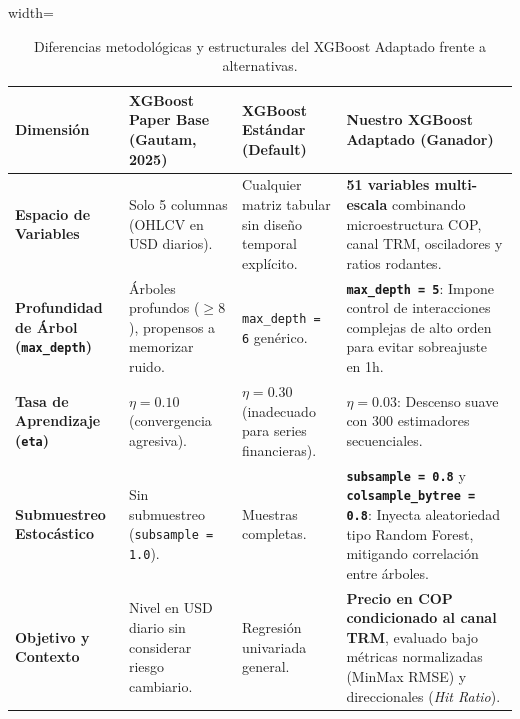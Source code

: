 \documentclass[12pt,letterpaper]{article}
\begin{document}
\begin{table}[H]
\centering
\caption{Diferencias metodológicas y estructurales del XGBoost Adaptado frente a alternativas.}
\label{tab:xgboost_differences}
\begin{adjustbox}{width=\textwidth}
\begin{tabular}{lp{4.5cm}p{4.5cm}p{4.5cm}}
\toprule
\textbf{Dimensión} & \textbf{XGBoost Paper Base (Gautam, 2025)} & \textbf{XGBoost Estándar (Default)} & \textbf{Nuestro XGBoost Adaptado (Ganador)} \\
\midrule
\textbf{Espacio de Variables} & Solo 5 columnas (OHLCV en USD diarios). & Cualquier matriz tabular sin diseño temporal explícito. & \textbf{51 variables multi-escala} combinando microestructura COP, canal TRM, osciladores y ratios rodantes. \\
\midrule
\textbf{Profundidad de Árbol (\texttt{max\_depth})} & Árboles profundos ($\ge 8$), propensos a memorizar ruido. & \texttt{max\_depth = 6} genérico. & \textbf{\texttt{max\_depth = 5}}: Impone control de interacciones complejas de alto orden para evitar sobreajuste en 1h. \\
\midrule
\textbf{Tasa de Aprendizaje (\texttt{eta})} & $\eta = 0.10$ (convergencia agresiva). & $\eta = 0.30$ (inadecuado para series financieras). & \textbf{$\eta = 0.03$}: Descenso suave con 300 estimadores secuenciales. \\
\midrule
\textbf{Submuestreo Estocástico} & Sin submuestreo (\texttt{subsample = 1.0}). & Muestras completas. & \textbf{\texttt{subsample = 0.8}} y \textbf{\texttt{colsample\_bytree = 0.8}}: Inyecta aleatoriedad tipo Random Forest, mitigando correlación entre árboles. \\
\midrule
\textbf{Objetivo y Contexto} & Nivel en USD diario sin considerar riesgo cambiario. & Regresión univariada general. & \textbf{Precio en COP condicionado al canal TRM}, evaluado bajo métricas normalizadas (MinMax RMSE) y direccionales (\textit{Hit Ratio}). \\
\bottomrule
\end{tabular}
\end{adjustbox}
\end{table}
\end{document}

